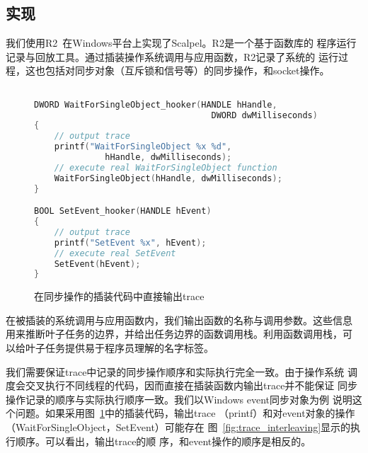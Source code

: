 

\subsection{实现}

我们使用R2~\cite{r2}在Windows平台上实现了Scalpel。R2是一个基于函数库的
程序运行记录与回放工具。通过插装操作系统调用与应用函数，R2记录了系统的
运行过程，这也包括对同步对象（互斥锁和信号等）的同步操作，和socket操作。

\begin{figure}
\centering
\begin{lstlisting}[language=C++]

DWORD WaitForSingleObject_hooker(HANDLE hHandle,
                                   DWORD dwMilliseconds)
{
    // output trace
    printf("WaitForSingleObject %x %d",
              hHandle, dwMilliseconds);
    // execute real WaitForSingleObject function
    WaitForSingleObject(hHandle, dwMilliseconds);
}

BOOL SetEvent_hooker(HANDLE hEvent)
{
    // output trace
    printf("SetEvent %x", hEvent);
    // execute real SetEvent
    SetEvent(hEvent);
}
\end{lstlisting}
\caption{在同步操作的插装代码中直接输出trace}
\label{fig:trace_direct}
\end{figure}

在被插装的系统调用与应用函数内，我们输出函数的名称与调用参数。这些信息
用来推断叶子任务的边界，并给出任务边界的函数调用栈。利用函数调用栈，可
以给叶子任务提供易于程序员理解的名字标签。


我们需要保证trace中记录的同步操作顺序和实际执行完全一致。由于操作系统
调度会交叉执行不同线程的代码，因而直接在插装函数内输出trace并不能保证
同步操作记录的顺序与实际执行顺序一致。我们以Windows event同步对象为例
说明这个问题。如果采用图~\ref{fig:trace_direct}中的插装代码，输出trace
（printf）和对event对象的操作（WaitForSingleObject，SetEvent）可能存在
图~\ref{fig:trace_interleaving}显示的执行顺序。可以看出，输出trace的顺
序，和event操作的顺序是相反的。

